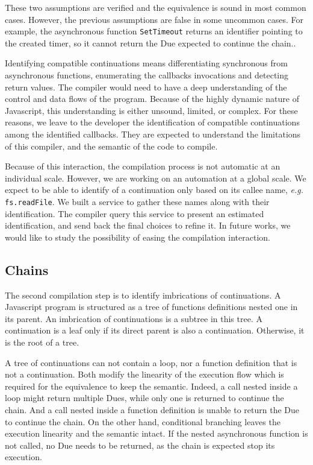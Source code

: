 These two assumptions are verified and the equivalence is sound in most common cases.
However, the previous assumptions are false in some uncommon cases.
For example, the asynchronous function \texttt{SetTimeout} returns an identifier pointing to the created timer, so it cannot return the Due expected to continue the chain..

Identifying compatible continuations means differentiating synchronous from asynchronous functions, enumerating the callbacks invocations and detecting return values.
The compiler would need to have a deep understanding of the control and data flows of the program.
Because of the highly dynamic nature of Javascript, this understanding is either unsound, limited, or complex.
For these reasons, we leave to the developer the identification of compatible continuations among the identified callbacks.
They are expected to understand the limitations of this compiler, and the semantic of the code to compile.

Because of this interaction, the compilation process is not automatic at an individual scale.
However, we are working on an automation at a global scale.
We expect to be able to identify of a continuation only based on its callee name, \textit{e.g.} \texttt{fs.readFile}.
We built a service to gather these names along with their identification.
The compiler query this service to present an estimated identification, and send back the final choices to refine it.
In future works, we would like to study the possibility of easing the compilation interaction.

\subsection{Chains}

The second compilation step is to identify imbrications of continuations.
A Javascript program is structured as a tree of functions definitions nested one in its parent.
An imbrication of continuations is a subtree in this tree.
A continuation is a leaf only if its direct parent is also a continuation.
Otherwise, it is the root of a tree.

A tree of continuations can not contain a loop, nor a function definition that is not a continuation.
Both modify the linearity of the execution flow which is required for the equivalence to keep the semantic.
Indeed, a call nested inside a loop might return multiple Dues, while only one is returned to continue the chain.
And a call nested inside a function definition is unable to return the Due to continue the chain.
On the other hand, conditional branching leaves the execution linearity and the semantic intact.
If the nested asynchronous function is not called, no Due needs to be returned, as the chain is expected stop its execution.

